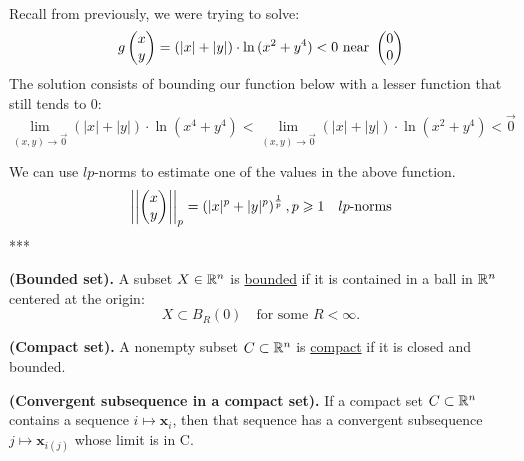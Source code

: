 \\

Recall from previously, we were trying to solve:
\[g\begin{pmatrix} x \\ y \end{pmatrix}= \left( |x|+|y| \right)\cdot \ln{(x^2+y^4)}<0 \text{ near }\begin{pmatrix} 0 \\ 0 \end{pmatrix}\]
The solution consists of bounding our function below with a lesser function that still tends to 0: 
\[\lim_{(x,y)\to \vec{0}}(|x|+|y|)\cdot \ln{(x^4+y^4)}<\lim_{(x,y)\to \vec{0}}(|x|+|y|)\cdot \ln{(x^2+y^4)}<\vec{0}\]

We can use $lp$-norms to estimate one of the values in the above function.
\[\left|\left| \begin{pmatrix} x \\ y \end{pmatrix}\right|\right|_p=\left(|x|^p + |y|^p\right)^{\frac{1}{p}}, p\geqslant 1\quad lp\text{-norms}\]
***

\iffalse
\[(x^4+y^4)^{\frac{1}{4}}\cdot \ln{(x^4+y^4)}<(|x|+|y|)\cdot \ln{(x^4+y^4)}<g\Point{x \\ y}<0\]
We can then rewrite the new function as
\[f\Point{x \\ y}=f(x^2+y^2)=f(u)=u^{\frac{1}{4}}\cdot \ln{(u)}\]
\[\lim_{u\rightarrow 0} f(u)=\lim_{u\rightarrow 0} u^{\frac{1}{4}}\cdot \ln{(u)}=\lim_{u\rightarrow 0} \frac{\ln{(u)}}{u^{-\frac{1}{4}}}=\lim_{u\rightarrow 0} \frac{(\ln{(u)})'}{(u^{-\frac{1}{4}})'}=\lim_{u\rightarrow 0} \frac{u^{-1}}{\frac{1}{4}u^{5/4}}\] \fi


\begin{defn}
  \textbf{(Bounded set).} A subset $X\in \mathbb{R}^n$ is \ul{bounded} if it is contained in a ball in $\mathbb{R}^n$ centered at the origin:
  \[X\subset B_R(0)\quad \text{for some }R<\infty.\]
\end{defn}

\begin{defn}
  \textbf{(Compact set).} A nonempty subset $C\subset \mathbb{R}^n$ is \ul{compact} if it is closed and bounded.
\end{defn}

\begin{theorem}
  \textbf{(Convergent subsequence in a compact set).} If a compact set $C\subset \mathbb{R}^n$ contains a sequence $i\mapsto \bm{x}_i$, then that sequence has a convergent subsequence $j\mapsto \bm{x}_{i(j)}$ whose limit is in C.
\end{theorem}
